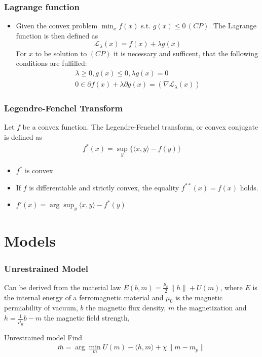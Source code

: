\documentclass[utf8,aspectratio=169,ngerman,english]{beamer}
\begin{document}
\begin{frame}
\frametitle{Lagrange function}
 \begin{itemize}
    \item Given the convex problem $\min_x f(x)$ s.t. $g(x) \leq 0 \,(CP)$. The Lagrange function is then defined as
    \begin{equation}
    \mathcal L_\lambda(x) = f(x) + \lambda g(x)
    \end{equation}
    For $x$ to be solution to $(CP)$ it is necessary and sufficent, that the following conditions are fulfilled:
    \begin{align}
        \lambda \geq 0, g(x) \leq 0, \lambda g(x) = 0 \\
        0 \in \partial f(x) + \lambda \partial g(x) = (\nabla \mathcal L_\lambda(x))
    \end{align}
 \end{itemize}


\end{frame}

\begin{frame}
 \frametitle{Legendre-Fenchel Transform}
 Let $f$ be a convex function. The Legendre-Fenchel transform, or convex conjugate is defined as
 \begin{align}
  f^*(x) =  \sup_y\{\langle x, y\rangle - f(y) \}
 \end{align}
 \begin{itemize}
  \item $f^*$ is convex
  \item If $f$ is differentiable and strictly convex, the equality $f^{**}(x) = f(x)$ holds.
  \item $f'(x) = \arg \sup_y \langle x,y \rangle - f^*(y)$
 \end{itemize}


\end{frame}

\section{Models}
\begin{frame}
\frametitle{Unrestrained Model}
Can be derived from the material law $E(b,m) = \frac{\mu_0}{2} \|h\| + U(m)$, where $E$ is the internal energy
of a ferromagnetic material and $\mu_0$ is the magnetic permiability of vacuum,
$b$ the magnetic flux density, $m$ the magnetization and $h = \frac{1}{\mu_0}b - m$ the magnetic field strength,
\begin{block}{Unrestrained model}
Find
 \begin{align}
  \bar m = \arg \min_m U(m) - \langle h , m \rangle + \chi \|m - m_p\|
 \end{align}
\end{block}
\end{frame}
\end{document}
